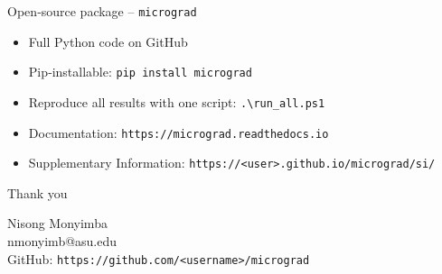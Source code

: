 \documentclass[aspectratio=169]{beamer}
\begin{document}
\begin{frame}{Open‑source package – \texttt{micrograd}}
\begin{itemize}
\item Full Python code on GitHub
\item Pip‑installable: \texttt{pip install micrograd}
\item Reproduce all results with one script: \texttt{.\textbackslash run\_all.ps1}
\item Documentation: \texttt{https://micrograd.readthedocs.io}
\item Supplementary Information: \texttt{https://<user>.github.io/micrograd/si/}
\end{itemize}
\end{frame}

\begin{frame}{Thank you}
\begin{center}
\Large
Nisong Monyimba\\
nmonyimb@asu.edu\\
\vspace{1cm}
GitHub: \texttt{https://github.com/<username>/micrograd}
\end{center}
\end{frame}
\end{document}
